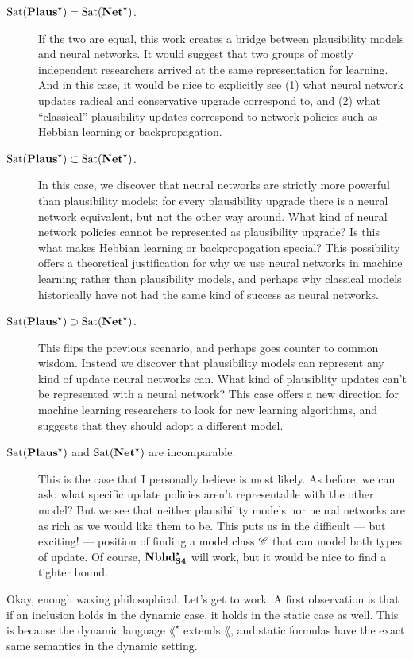 \documentclass[letterpaper]{article}
\begin{document}
\begin{description}
    \item[$\mathrm{Sat}( \textrm{\textbf{Plaus}}^\star ) = \mathrm{Sat}( \textrm{\textbf{Net}}^\star )$.] If the two are equal, this work creates a bridge between plausibility models and neural networks.  It would suggest that two groups of mostly independent researchers arrived at the same representation for learning.  And in this case, it would be nice to explicitly see (1) what neural network updates radical and conservative upgrade correspond to, and (2) what ``classical'' plausibility updates correspond to network policies such as Hebbian learning or backpropagation.
    \item[$\mathrm{Sat}( \textrm{\textbf{Plaus}}^\star ) \subset \mathrm{Sat}( \textrm{\textbf{Net}}^\star )$.] In this case, we discover that neural networks are strictly more powerful than plausibility models: for every plausibility upgrade there is a neural network equivalent, but not the other way around.  What kind of neural network policies cannot be represented as plausibility upgrade?  Is this what makes Hebbian learning or backpropagation special?  This possibility offers a theoretical justification for why we use neural networks in machine learning rather than plausibility models, and perhaps why classical models historically have not had the same kind of success as neural networks.
    \item[$\mathrm{Sat}( \textrm{\textbf{Plaus}}^\star ) \supset \mathrm{Sat}( \textrm{\textbf{Net}}^\star )$.] This flips the previous scenario, and perhaps goes counter to common wisdom.  Instead we discover that plausibility models can represent any kind of update neural networks can.  What kind of plausiblity updates can't be represented with a neural network?  This case offers a new direction for machine learning researchers to look for new learning algorithms, and suggests that they should adopt a different model. 
    \item[$\mathrm{Sat}( \textrm{\textbf{Plaus}}^\star )$ and $\mathrm{Sat}( \textrm{\textbf{Net}}^\star )$ are incomparable.] This is the case that I personally believe is most likely.  As before, we can ask: what specific update policies aren't representable with the other model?  But we see that neither plausibility models nor neural networks are as rich as we would like them to be.  This puts us in the difficult --- but exciting! --- position of finding a model class $\mathscr{C}$ that can model both types of update.  Of course, $\textrm{\textbf{Nbhd}}_\textrm{\textbf{S4}}^\star$ will work, but it would be nice to find a tighter bound.
\end{description}

Okay, enough waxing philosophical. Let's get to work. A first observation is that if an inclusion holds in the dynamic case, it holds in the static case as well.  This is because the dynamic language $\lang^\star$ extends $\lang$, and static formulas have the exact same semantics in the dynamic setting.
\end{document}

